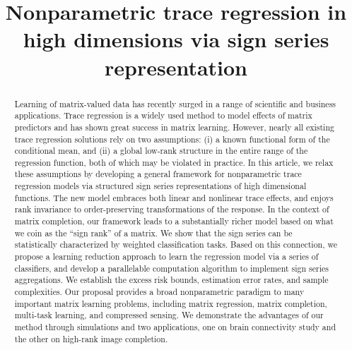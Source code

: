 \documentclass[aos]{imsart}
\theoremstyle{definition}
\begin{document}
\begin{frontmatter}
\title{Nonparametric trace regression in high dimensions via sign series representation}




\begin{abstract}
Learning of matrix-valued data has recently surged in a range of scientific and business applications. Trace regression is a widely used method to model effects of matrix predictors and has shown great success in matrix learning. However, nearly all existing trace regression solutions rely on two assumptions: (i) a known functional form of the conditional mean, and (ii) a global low-rank structure in the entire range of the regression function, both of which may be violated in practice. In this article, we relax these assumptions by developing a general framework for nonparametric trace regression models via structured sign series representations of high dimensional functions. The new model embraces both linear and nonlinear trace effects, and enjoys rank invariance to order-preserving transformations of the response. In the context of matrix completion, our framework leads to a substantially richer model based on what we coin as the ``sign rank'' of a matrix. We show that the sign series can be statistically characterized by weighted classification tasks. Based on this connection, we propose a learning reduction approach to learn the regression model via a series of classifiers, and develop a parallelable computation algorithm to implement sign series aggregations. We establish the excess risk bounds, estimation error rates, and sample complexities. Our proposal provides a broad nonparametric paradigm to many important matrix learning problems, including matrix regression, matrix completion, multi-task learning, and compressed sensing. We demonstrate the advantages of our method through simulations and two applications, one on brain connectivity study and the other on high-rank image completion. 
\end{abstract}


\begin{keyword}[class=MSC2020]
\end{keyword}
\begin{keyword}
\end{keyword}

\end{frontmatter}
\end{document}
